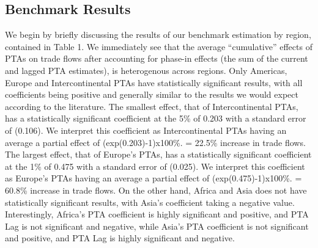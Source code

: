 \documentclass[12pt]{article}%
\begin{document}
%
\subsection{Benchmark Results}%
\label{subsec:BenchmarkResults}%
We begin by briefly discussing the results of our benchmark estimation
by region, contained in Table 1. We immediately see that the average
``cumulative'' effects of PTAs on trade flows after accounting for
phase-in effects (the sum of the current and lagged PTA estimates), is
heterogenous across regions. Only Americas, Europe and Intercontinental
PTAs have statistically significant results, with all coefficients being
positive and generally similar to the results we would expect according
to the literature. The smallest effect, that of Intercontinental PTAs,
has a statistically significant coefficient at the 5\% of 0.203 with a
standard error of (0.106). We interpret this coefficient as
Intercontinental PTAs having an average a partial effect of
(exp(0.203)-1)x100\%. = 22.5\% increase in trade flows. The largest
effect, that of Europe's PTAs, has a statistically significant
coefficient at the 1\% of 0.475 with a standard error of (0.025). We
interpret this coefficient as Europe's PTAs having an average a partial
effect of (exp(0.475)-1)x100\%. = 60.8\% increase in trade flows. On the
other hand, Africa and Asia does not have statistically significant
results, with Asia's coefficient taking a negative value. Interestingly,
Africa's PTA coefficient is highly significant and positive, and PTA Lag
is not significant and negative, while Asia's PTA coefficient is not
significant and positive, and PTA Lag is highly significant and
negative.
%
%
\FloatBarrier

%
\end{document}
